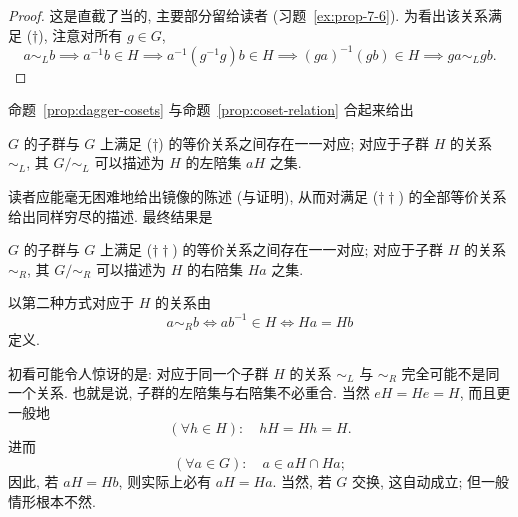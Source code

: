 \begin{proof}
这是直截了当的, 主要部分留给读者 (习题~\ref{ex:prop-7-6}). 为看出该关系满足 ($\dagger$), 注意对所有 $g \in G$,
\[
a \sim_L b \implies a^{-1}b \in H \implies a^{-1}(g^{-1}g)b \in H \implies (ga)^{-1}(gb) \in H \implies ga \sim_L gb.
\]
\end{proof}

命题~\ref{prop:dagger-cosets} 与命题~\ref{prop:coset-relation} 合起来给出

\begin{proposition}
\label{prop:correspondence-L}
$G$ 的子群与 $G$ 上满足 ($\dagger$) 的等价关系之间存在一一对应; 对应于子群 $H$ 的关系 $\sim_L$, 其 $G/{\sim_L}$ 可以描述为 $H$ 的左陪集 $aH$ 之集.
\end{proposition}

读者应能毫无困难地给出镜像的陈述 (与证明), 从而对满足 ($\dagger\dagger$) 的全部等价关系给出同样穷尽的描述. 最终结果是

\begin{proposition}
\label{prop:correspondence-R}
$G$ 的子群与 $G$ 上满足 ($\dagger\dagger$) 的等价关系之间存在一一对应; 对应于子群 $H$ 的关系 $\sim_R$, 其 $G/{\sim_R}$ 可以描述为 $H$ 的右陪集 $Ha$ 之集.
\end{proposition}

以第二种方式对应于 $H$ 的关系由
\[
a \sim_R b \iff ab^{-1} \in H \iff Ha = Hb
\]
定义.

初看可能令人惊讶的是: 对应于同一个子群 $H$ 的关系 $\sim_L$ 与 $\sim_R$ 完全可能不是同一个关系. 也就是说, 子群的左陪集与右陪集不必重合. 当然 $eH = He = H$, 而且更一般地
\[
(\forall h \in H): \quad hH = Hh = H.
\]
进而
\[
(\forall a \in G): \quad a \in aH \cap Ha;
\]
因此, 若 $aH = Hb$, 则实际上必有 $aH = Ha$. 当然, 若 $G$ 交换, 这自动成立; 但一般情形根本不然.

